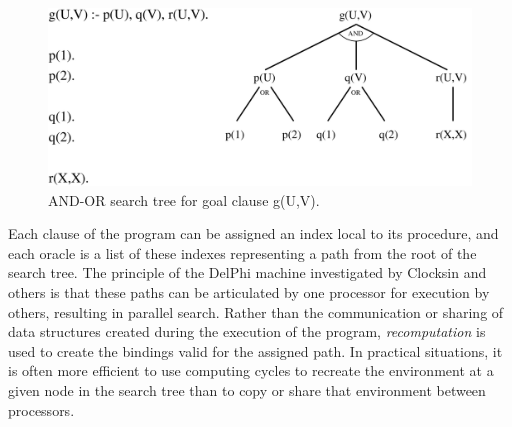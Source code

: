 \documentclass[a4paper,11pt,twoside]{article}
\begin{document}
\begin{figure}
  \includegraphics[width=\linewidth]{and_or_tree.png}
  \caption{AND-OR search tree for goal clause g(U,V).}
  \label{and_or_tree}
\end{figure}

Each clause of the program can be assigned an index local to its procedure, and
each oracle is a list of these indexes representing a path
from the root of the search tree.
The principle of the DelPhi machine investigated by Clocksin
and others \cite{Clo87, Sar95, Lew98} is that these paths can be articulated by
one processor for execution by others, resulting in parallel search.  Rather
than the communication or sharing of data structures created during the execution
of the program, \textit{recomputation} is used to create the bindings valid for
the assigned path.  In practical situations, it is often more efficient to use
computing cycles to recreate the environment at a given node in the search tree
than to copy or share that environment between processors.
\end{document}
